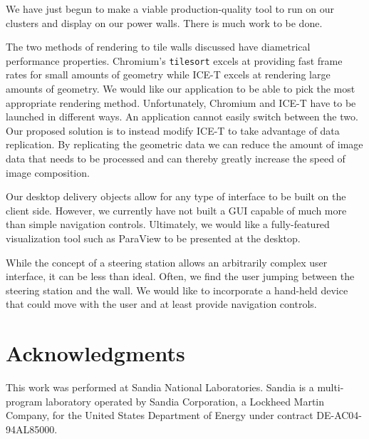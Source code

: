 \documentclass[twocolumn]{article}
\newcommand{\cidentifier}[1]{\texttt{#1}}
\begin{document}
  We have just begun to make a viable production-quality tool to run on our
  clusters and display on our power walls.  There is much work to be done.

  The two methods of rendering to tile walls discussed have diametrical
  performance properties.  Chromium's \cidentifier{tile\-sort} excels at
  providing fast frame rates for small amounts of geometry while ICE-T
  excels at rendering large amounts of geometry.  We would like our
  application to be able to pick the most appropriate rendering method.
  Unfortunately, Chromium and ICE-T have to be launched in different ways.
  An application cannot easily switch between the two.  Our proposed
  solution is to instead modify ICE-T to take advantage of data
  replication.  By replicating the geometric data we can reduce the amount
  of image data that needs to be processed and can thereby greatly increase
  the speed of image composition.

  Our desktop delivery objects allow for any type of interface to be built
  on the client side.  However, we currently have not built a GUI capable
  of much more than simple navigation controls.  Ultimately, we would like
  a fully-featured visualization tool such as ParaView \cite{Law01} to be
  presented at the desktop.

  While the concept of a steering station allows an arbitrarily complex
  user interface, it can be less than ideal.  Often, we find the user
  jumping between the steering station and the wall.  We would like to
  incorporate a hand-held device that could move with the user and at least
  provide navigation controls.


  \section{Acknowledgments}

  This work was performed at Sandia National Laboratories.  Sandia is a
  multi-program laboratory operated by Sandia Corporation, a Lockheed
  Martin Company, for the United States Department of Energy under contract
  DE-AC04-94AL85000.


  
  
\end{document}
